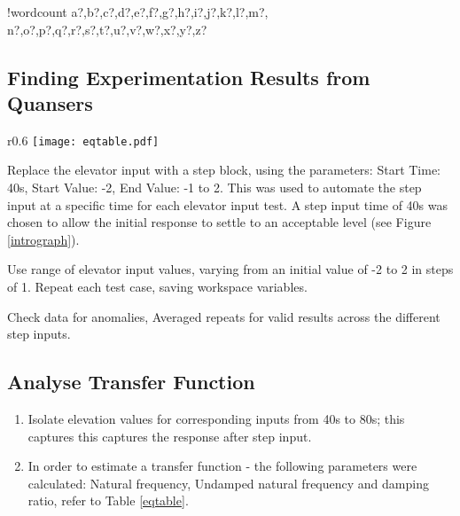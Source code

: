 \documentclass[11pt]{article}
\newcounter{words}
\newenvironment{counted}{%
  \setcounter{words}{0}
  \SearchList!{wordcount}{\stepcounter{words}}
    {a?,b?,c?,d?,e?,f?,g?,h?,i?,j?,k?,l?,m?,
    n?,o?,p?,q?,r?,s?,t?,u?,v?,w?,x?,y?,z?}
  \UndoBoundary{'}
  \SearchOrder{p;}}{%
  \StopSearching}
\begin{document}
\begin{counted}
\subsection{Finding Experimentation Results from
Quansers}\label{finding-experimentation-results-from-quansers}

\begin{enumerate}
  \item
    \parbox[t]{\dimexpr\textwidth-\leftmargin}{%
      \vspace{-3mm}
      \begin{wrapfigure}{r}{0.6\textwidth}
      \vspace{-10pt}
        \centering
\texttt{[image: eqtable.pdf]}
\label{eqtable}
\vspace{-25pt}
      \end{wrapfigure}
      Replace the elevator input with a step block, using the parameters: Start Time: 40s, Start Value: -2, End Value: -1 to 2. This was used to automate the step input at a specific time for each elevator input test. A step input time of 40s was chosen to allow the initial response to settle to an acceptable level (see Figure \ref{intrograph}).
      \vspace{3mm}
      \item Use range of elevator input values, varying from an initial value of -2 to 2 in steps of 1. Repeat each test case, saving workspace variables.
      \vspace{3mm}
      \item Check data for anomalies, Averaged repeats for valid results across the different step inputs.
    }
  \end{enumerate}

\subsection{Analyse Transfer Function}\label{analyse-transfer-function}

\begin{enumerate}

\item
  Isolate elevation values for corresponding inputs from 40s to 80s;
  this captures this captures the response after step input.
\item
  In order to estimate a transfer function - the following parameters
  were calculated: Natural frequency, Undamped natural frequency and
  damping ratio, refer to Table \ref{eqtable}.
\end{enumerate}


\end{counted}
\end{document}
